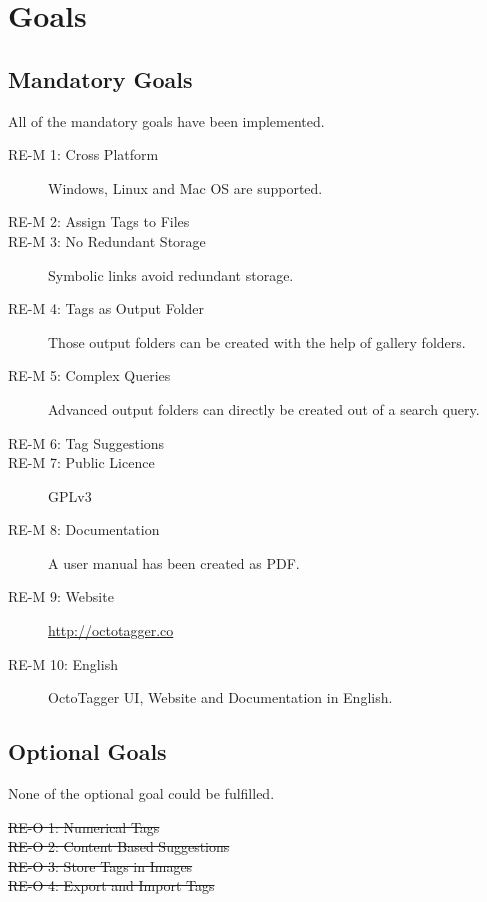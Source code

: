 \section{Goals}
\def\kapitelautor{Julian Lorenz}
\subsection{Mandatory Goals}

All of the mandatory goals have been implemented.

\begin{description}
\item [RE-M 1: Cross Platform] Windows, Linux and Mac OS are supported. \checkmark
\item [RE-M 2: Assign Tags to Files] \checkmark
\item [RE-M 3: No Redundant Storage] Symbolic links avoid redundant storage. \checkmark
\item [RE-M 4: Tags as Output Folder] Those output folders can be created with the help of gallery folders. \checkmark
\item [RE-M 5: Complex Queries] Advanced output folders can directly be created out of a search query. \checkmark
\item [RE-M 6: Tag Suggestions] \checkmark
\item [RE-M 7: Public Licence] GPLv3 \checkmark
\item [RE-M 8: Documentation] A user manual has been created as PDF. \checkmark
\item [RE-M 9: Website] \url{http://octotagger.co} \checkmark
\item [RE-M 10: English] OctoTagger UI, Website and Documentation in English. \checkmark
\end{description}


\subsection{Optional Goals}

None of the optional goal could be fulfilled.

\begin{description}
\item [\st{RE-O 1: Numerical Tags}]
\item [\st{RE-O 2: Content Based Suggestions}] 
\item [\st{RE-O 3: Store Tags in Images}] 
\item [\st{RE-O 4: Export and Import Tags}] 

\end{description}


